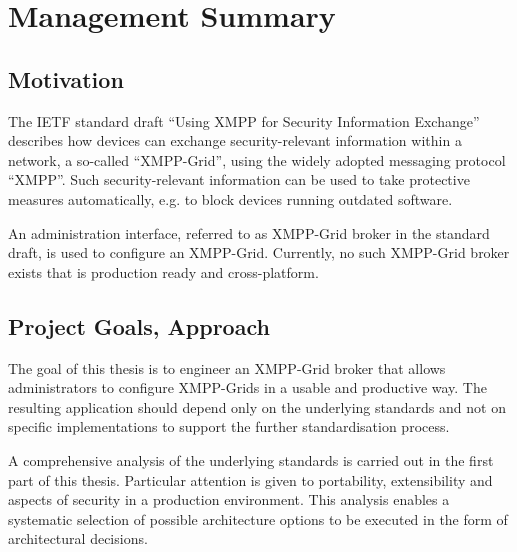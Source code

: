 
\chapter{Management Summary}

\section*{Motivation}
The IETF standard draft ``Using XMPP for Security Information Exchange'' describes how devices can exchange security-relevant information within a network, a so-called ``XMPP-Grid'', using the widely adopted messaging protocol ``XMPP''.
Such security-relevant information can be used to take protective measures automatically, e.g. to block devices running outdated software.

An administration interface, referred to as XMPP-Grid broker in the standard draft, is used to configure an XMPP-Grid.
Currently, no such XMPP-Grid broker exists that is production ready and cross-platform.

\section*{Project Goals, Approach}

The goal of this thesis is to engineer an XMPP-Grid broker that allows administrators to configure XMPP-Grids in a usable and productive way.
The resulting application should depend only on the underlying standards and not on specific implementations to support the further standardisation process.

A comprehensive analysis of the underlying standards is carried out in the first part of this thesis.
Particular attention is given to portability, extensibility and aspects of security in a production environment.
This analysis enables a systematic selection of possible architecture options to be executed in the form of architectural decisions.

